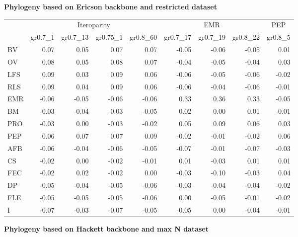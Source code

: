 \begin{landscape}
\begin{table}
\begin{footnotesize}
\textbf{Phylogeny based on Ericson backbone and restricted dataset}

\begin{tabular}{@{}l|rrrr|rrr|r@{}}
\toprule
 & \multicolumn{4}{c|}{Iteroparity} & \multicolumn{3}{c|}{EMR} & \multicolumn{1}{c}{PEP}\\
 & gr0.7\_1 & gr0.7\_13 & gr0.75\_1 & gr0.8\_60 & gr0.7\_17 & gr0.7\_19 & gr0.8\_22 & gr0.8\_5\\
\midrule
BV & 0.07 & 0.05 & 0.07 & 0.07 & -0.05 & -0.06 & -0.05 & 0.01\\
OV & 0.08 & 0.05 & 0.08 & 0.07 & -0.04 & -0.05 & -0.04 & 0.03\\
LFS & 0.09 & 0.03 & 0.09 & 0.06 & -0.06 & -0.05 & -0.06 & -0.02\\
RLS & 0.09 & 0.04 & 0.09 & 0.06 & -0.06 & -0.04 & -0.06 & -0.01\\
EMR & -0.06 & -0.05 & -0.06 & -0.06 & 0.33 & 0.36 & 0.33 & -0.05\\
BM & -0.03 & -0.04 & -0.03 & -0.05 & 0.02 & 0.00 & 0.01 & -0.01\\
PRO & -0.03 & 0.00 & -0.03 & -0.02 & 0.05 & 0.09 & 0.06 & 0.03\\
PEP & 0.06 & 0.07 & 0.07 & 0.09 & -0.02 & -0.01 & -0.02 & 0.06\\
AFB & -0.06 & -0.04 & -0.06 & -0.05 & -0.07 & -0.01 & -0.07 & -0.03\\
CS & -0.02 & 0.00 & -0.02 & -0.01 & 0.01 & -0.03 & 0.01 & 0.01\\
FEC & -0.02 & 0.02 & -0.02 & 0.00 & -0.03 & -0.10 & -0.03 & 0.04\\
DP & -0.05 & -0.04 & -0.05 & -0.06 & -0.03 & -0.04 & -0.04 & -0.02\\
FLE & -0.05 & -0.05 & -0.05 & -0.06 & 0.00 & -0.05 & -0.01 & -0.02\\
I & -0.07 & -0.03 & -0.07 & -0.05 & -0.05 & 0.00 & -0.04 & -0.01\\
\bottomrule
\end{tabular}
\end{footnotesize}
\end{table}


\clearpage%

\begin{table}
\center
\begin{footnotesize}

\textbf{Phylogeny based on Hackett backbone and max N dataset}


\end{footnotesize}
\end{table}
\end{landscape}
